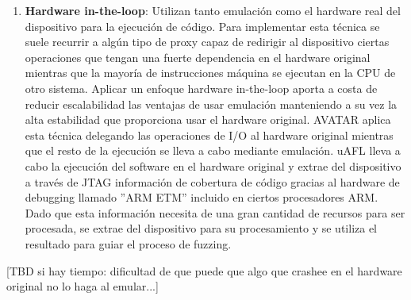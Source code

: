 \begin{enumerate}[I]
    principal es combinar la emulación de binarios mediante (I) durante la mayor parte del tiempo y poder de forma dinámica cambiar a (II) si se es 
    requerido durante la ejecución.
    \item \textbf{Hardware in-the-loop}: Utilizan tanto emulación como el hardware real del dispositivo para la ejecución de código. Para implementar esta 
    técnica se suele recurrir a algún tipo de proxy capaz de redirigir al dispositivo ciertas operaciones que tengan una fuerte dependencia en el hardware
    original mientras que la mayoría de instrucciones máquina se ejecutan en la CPU de otro sistema. Aplicar un enfoque hardware in-the-loop aporta a costa 
    de reducir escalabilidad las ventajas de usar emulación manteniendo a su vez la alta estabilidad que proporciona usar el hardware original.
    AVATAR\cite{Zaddach2014} aplica esta técnica delegando las operaciones de I/O al hardware original mientras que el resto de la ejecución se lleva a 
    cabo mediante emulación. uAFL\cite{uAFL} lleva a cabo la ejecución del software en el hardware original y extrae del dispositivo a través de JTAG
    información de cobertura de código gracias al hardware de debugging llamado ''ARM ETM'' incluido en ciertos procesadores ARM. Dado que 
    esta información necesita de una gran cantidad de recursos para ser procesada, se extrae del dispositivo para su procesamiento y se utiliza el resultado
    para guiar el proceso de fuzzing.
\end{enumerate}

[TBD si hay tiempo: dificultad de que puede que algo que crashee en el hardware original no lo haga al emular...]

